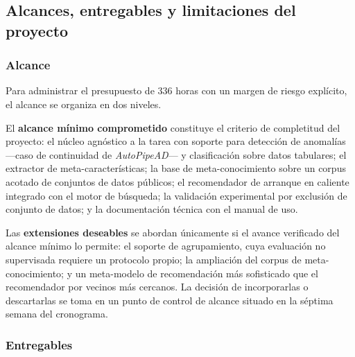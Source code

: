 \documentclass[12pt,letterpaper,oneside]{article}
\begin{document}
\subsection{Alcances, entregables y limitaciones del proyecto}
\label{sec:alcances}

\subsubsection{Alcance}

Para administrar el presupuesto de 336 horas con un margen de riesgo explícito, el
alcance se organiza en dos niveles.

El \textbf{alcance mínimo comprometido} constituye el criterio de completitud del
proyecto: el núcleo agnóstico a la tarea con soporte para detección de anomalías —caso de
continuidad de \textit{AutoPipeAD}— y clasificación sobre datos tabulares; el extractor
de meta-características; la base de meta-conocimiento sobre un corpus acotado de
conjuntos de datos públicos; el recomendador de arranque en caliente integrado con el
motor de búsqueda; la validación experimental por exclusión de conjunto de datos; y la
documentación técnica con el manual de uso.

Las \textbf{extensiones deseables} se abordan únicamente si el avance verificado del
alcance mínimo lo permite: el soporte de agrupamiento, cuya evaluación no supervisada
requiere un protocolo propio; la ampliación del corpus de meta-conocimiento; y un
meta-modelo de recomendación más sofisticado que el recomendador por vecinos más
cercanos. La decisión de incorporarlas o descartarlas se toma en un punto de control de
alcance situado en la séptima semana del cronograma.

\subsubsection{Entregables}
\end{document}
